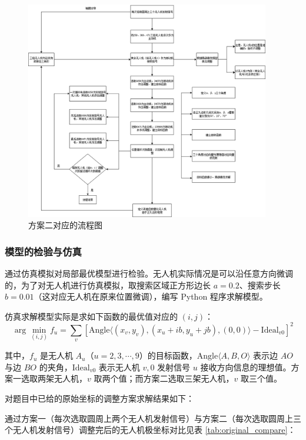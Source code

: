 \documentclass[withoutpreface,bwprint]{cumcmthesis} %
\begin{document}
\begin{enumerate}
\begin{figure}[H]
    \centering
    \includegraphics[width=0.95\textwidth]{../../figure/q3_2.png} 
    \caption{方案二对应的流程图}
    \label{q3_2}    
\end{figure}

\end{enumerate}


\subsubsection{模型的检验与仿真}
通过仿真模拟对局部最优模型进行检验。无人机实际情况是可以沿任意方向微调的，为了对无人机进行仿真模拟，取搜索区域正方形边长 \( a = 0.2 \)、搜索步长 \( b = 0.01 \)（这对应无人机在原来位置微调），编写 Python 程序求解模型。

仿真求解模型实际是求如下函数的最优值对应的 \( (i,j) \)：
\[
\arg\min_{(i,j)} f_u = \sum_v \left[ \text{Angle}\langle (x_v, y_v), (x_u + ib, y_u + jb), (0,0) \rangle - \text{Ideal}_{v0} \right]^2
\]

其中，\( f_u \) 是无人机 \( A_u \)（\( u = 2,3,\cdots,9 \)）的目标函数，\( \text{Angle}\langle A, B, O \rangle \) 表示边 \( AO \) 与边 \( BO \) 的夹角，\( \text{Ideal}_{v0} \) 表示无人机 \( v,0 \) 发射信号 \( u \) 接收方向信息的理想值。方案一选取两架无人机，\( v \) 取两个值；而方案二选取三架无人机，\( v \) 取三个值。

对题目中已给的原始坐标的调整方案求解结果如下：

通过方案一（每次选取圆周上两个无人机发射信号）与方案二（每次选取圆周上三个无人机发射信号）调整完后的无人机极坐标对比见表 \ref{tab:original_compare}：
\end{document}
